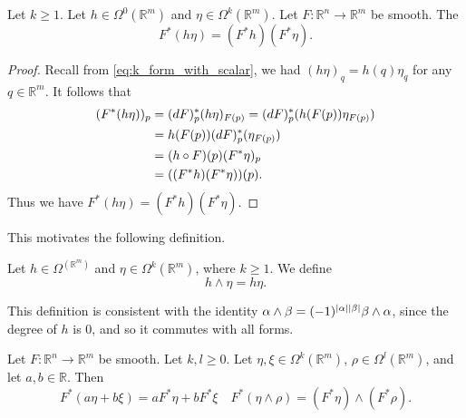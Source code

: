 \documentclass[notoc,notitlepage]{tufte-book}
\begin{document}
\begin{lemma}\label{lemma:linearity_of_the_pullback_over_the_0_form_that_is_a_scalar}
  Let $k \geq 1$. Let $h \in \Omega^0(\mathbb{R}^m)$ and $\eta \in
  \Omega^k(\mathbb{R}^m)$. Let $F : \mathbb{R}^n \to \mathbb{R}^m$ be smooth. The
  \begin{equation*}
    F^* (h \eta) = (F^* h)(F^* \eta).
  \end{equation*}
\end{lemma}

\begin{proof}
  Recall from \cref{eq:k_form_with_scalar}, we had $(h \eta)_q = h(q) \eta_q$ for any $q
  \in \mathbb{R}^m$. It follows that
  \begin{align*}
    (F^* (h\eta))_p &= (\mathop{}\!d{F})_p^*(h\eta)_{F(p)} = (\mathop{}\!d{F})_p^*(h(F(p))\eta_{F(p)}) \\
                    &= h(F(p)) (\mathop{}\!d{F})_p^* (\eta_{F(p)}) \\
                    &= (h \circ F)(p) (F^* \eta)_p \\
                    &= ((F^* h)(F^* \eta))(p).
  \end{align*}
  Thus we have $F^* (h \eta) = (F^* h)(F^* \eta)$.
\end{proof}

This motivates the following definition.

\begin{defn}\label{defn:wedge_product_of_a_0_form_and_k_form}
  Let $h \in \Omega^(\mathbb{R}^m)$ and $\eta \in \Omega^k(\mathbb{R}^m)$, where $k \geq
  1$. We define
  \begin{equation*}
    h \land \eta = h \eta.
  \end{equation*}
\end{defn}

\begin{note}
  This definition is consistent with the identity $\alpha \land \beta = (-1)^{\left|\alpha\right|
  \left|\beta\right|} \beta \land \alpha$, since the degree of $h$ is $0$, and so it commutes
  with all forms.
\end{note}

\begin{crly}\label{crly:general_linearity_of_the_pullback}
  Let $F : \mathbb{R}^n \to \mathbb{R}^m$ be smooth. Let $k, l \geq 0$. Let $\eta, \xi \in
  \Omega^k(\mathbb{R}^m)$, $\rho \in \Omega^l(\mathbb{R}^m)$, and let $a, b \in
  \mathbb{R}$. Then
  \begin{equation*}
    F^* (a \eta + b \xi) = a F^* \eta + b F^* \xi \quad F^* (\eta \land \rho) = (F^* \eta)
    \land (F^* \rho).
  \end{equation*}
\end{crly}
\end{document}
